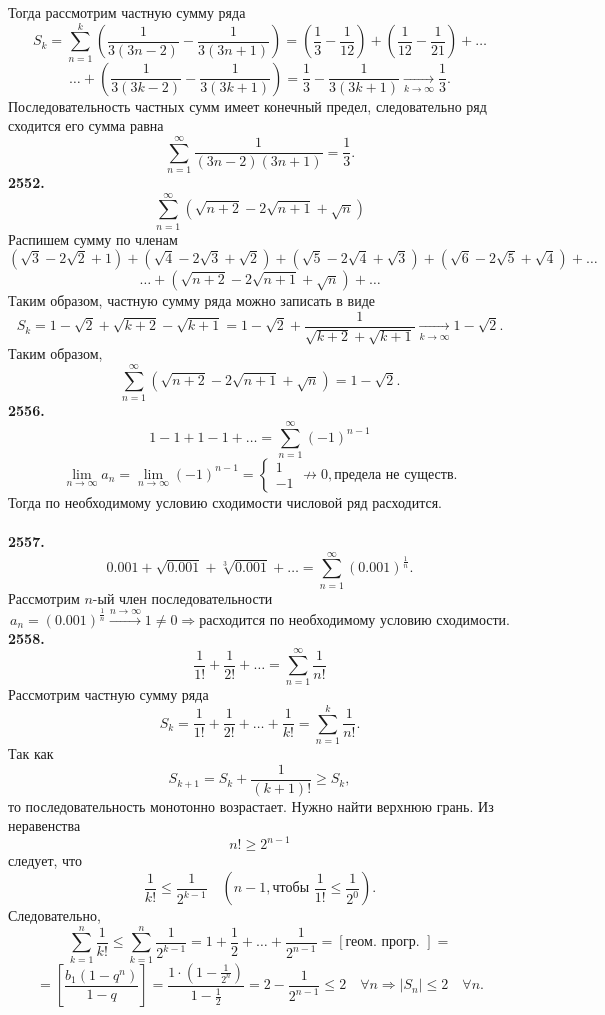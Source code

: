 \documentclass[a4paper, 12pt]{report}
\numberwithin{equation}{section}
\begin{document}
	Тогда рассмотрим частную сумму ряда
	$$ S_k = \sum_{n=1}^{k} \left( \frac{1}{3(3n-2)} - \frac{1}{3(3n+1)} \right) = \left( \frac{1}{3} - \frac{1}{12} \right) + \left( \frac{1}{12} - \frac{1}{21} \right) + \dots $$
	$$ \dots + \left( \frac{1}{3(3k-2)} - \frac{1}{3(3k+1)} \right) = \frac{1}{3} - \frac{1}{3(3k+1)} \xrightarrow[k \to \infty]{} \frac{1}{3}.$$
	Последовательность частных сумм имеет конечный предел, следовательно ряд сходится его сумма равна
	$$ \sum_{n=1}^{\infty} \frac{1}{(3n-2)(3n+1)} = \frac{1}{3}.$$
	\textbf{2552.}
	$$ \sum_{n=1}^{\infty} (\sqrt{n+2} - 2\sqrt{n+1} + \sqrt{n})$$ 
	Распишем сумму по членам
	$$(\sqrt{3} - 2\sqrt{2} + 1) + (\sqrt{4} - 2\sqrt{3} + \sqrt{2}) + (\sqrt{5} - 2\sqrt{4} + \sqrt{3}) + (\sqrt{6} - 2\sqrt{5} + \sqrt{4}) + \dots $$ $$\ldots + (\sqrt{n+2} - 2\sqrt{n+1} + \sqrt{n}) + \dots $$
	Таким образом, частную сумму ряда можно записать в виде
	$$ S_k = 1 - \sqrt{2} + \sqrt{k+2} - \sqrt{k+1} = 1 - \sqrt{2} + \frac{1}{\sqrt{k+2} + \sqrt{k+1}} \xrightarrow[k \to \infty]{} 1-\sqrt{2}.$$
	Таким образом,
	$$ \sum_{n=1}^{\infty} (\sqrt{n+2} - 2\sqrt{n+1} + \sqrt{n}) = 1 - \sqrt{2}.$$
	\textbf{2556.}
	$$ 1-1+1-1+\dots = \sum_{n=1}^{\infty} (-1)^{n-1} $$
	$$ \lim_{n \to \infty} a_n = \lim_{n \to \infty} (-1)^{n-1} = \begin{cases} 1 \\ -1 \end{cases} \not\to 0, \text{предела не существ.} $$
	Тогда по необходимому условию сходимости числовой ряд расходится.
	\\\\
	\textbf{2557.}
	$$ 0.001 + \sqrt{0.001} + \sqrt[3]{0.001} + \dots = \sum_{n=1}^{\infty} (0.001)^{\frac{1}{n}}.$$
	Рассмотрим $n$-ый член последовательности
	$$ a_n = (0.001)^{\frac{1}{n}} \xrightarrow{n \to \infty} 1 \ne 0 \Rightarrow \text{расходится по необходимому условию сходимости.} $$
	\textbf{2558.}
	$$ \frac{1}{1!} + \frac{1}{2!} + \dots = \sum_{n=1}^{\infty} \frac{1}{n!} $$
	Рассмотрим частную сумму ряда
	$$ S_k = \frac{1}{1!} + \frac{1}{2!} + \dots + \frac{1}{k!} = \sum_{n=1}^{k} \frac{1}{n!}.$$
	Так как
	$$ S_{k+1} = S_k + \frac{1}{(k+1)!} \ge S_k,$$
	то последовательность монотонно возрастает. Нужно найти верхнюю грань.
	Из неравенства $$ n! \ge 2^{n-1} $$ следует, что
	$$ \frac{1}{k!} \le \frac{1}{2^{k-1}} \quad \left(n-1, \text{чтобы } \frac{1}{1!} \le \frac{1}{2^0}\right).$$
	Следовательно,
	$$ \sum_{k=1}^{n} \frac{1}{k!} \le \sum_{k=1}^{n} \frac{1}{2^{k-1}} = 1 + \frac{1}{2} + \dots + \frac{1}{2^{n-1}} = [\text{геом. прогр. }] = $$
	$$ = \left[ \frac{b_1(1-q^n)}{1-q} \right] = \frac{1 \cdot (1-\frac{1}{2^n})}{1-\frac{1}{2}} = 2 - \frac{1}{2^{n-1}} \le 2 \quad \forall n \Rightarrow |S_n| \le 2 \quad \forall n. $$
\end{document}
